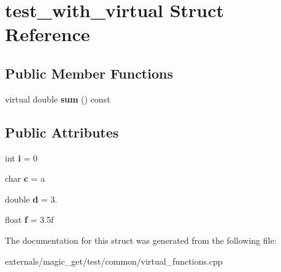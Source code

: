 \hypertarget{structtest__with__virtual}{}\section{test\+\_\+with\+\_\+virtual Struct Reference}
\label{structtest__with__virtual}
\subsection*{Public Member Functions}
\begin{DoxyCompactItemize}
\item 
\mbox{\label{structtest__with__virtual_a646d6b84e4800a50e625ccc88f37ee66}} 
virtual double {\bfseries sum} () const
\end{DoxyCompactItemize}
\subsection*{Public Attributes}
\begin{DoxyCompactItemize}
\item 
\mbox{\label{structtest__with__virtual_aba8eef3b0b63768160b691341b1378f8}} 
int {\bfseries i} = 0
\item 
\mbox{\label{structtest__with__virtual_a90944083b33502c7e1246dccf9351381}} 
char {\bfseries c} = \textquotesingle{}a\textquotesingle{}
\item 
\mbox{\label{structtest__with__virtual_aac0c88cfaf9ce33845db91e45e5bac52}} 
double {\bfseries d} = 3.
\item 
\mbox{\label{structtest__with__virtual_abb68a15b56f9022d03d873ad267266ab}} 
float {\bfseries f} = 3.\+5f
\end{DoxyCompactItemize}


The documentation for this struct was generated from the following file\+:\begin{DoxyCompactItemize}
\item 
externals/magic\+\_\+get/test/common/virtual\+\_\+functions.\+cpp\end{DoxyCompactItemize}
